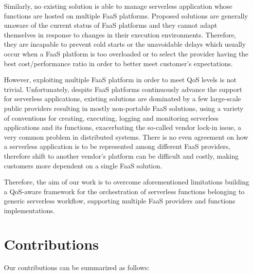 \documentclass[12pt,a4paper]{report}
\begin{document}
Similarly, no existing solution is able to manage serverless application whose functions are hosted on multiple FaaS platforms. Proposed solutions are generally unaware of the current status of FaaS platforms and they cannot adapt themselves in response to changes in their execution environments. Therefore, they are incapable to prevent cold starts or the unavoidable delays which usually occur when a FaaS platform is too overloaded or to select the provider having the best cost/performance ratio in order to better meet customer's expectations.

However, exploiting multiple FaaS platform in order to meet QoS levels is not trivial. Unfortunately, despite FaaS platforms continuously advance the support for serverless applications, existing solutions are dominated by a few large-scale public providers resulting in mostly non-portable FaaS solutions, using a variety of conventions for creating, executing, logging and monitoring serverless applications and its functions, exacerbating the so-called vendor lock-in issue, a very common problem in distributed systems. There is no even agreement on how a serverless application is to be represented among different FaaS providers, therefore shift to another vendor's platform can be difficult and costly, making customers more dependent on a single FaaS solution.

Therefore, the aim of our work is to overcome aforementioned limitations building a QoS-aware framework for the orchestration of serverless functions belonging to generic serverless workflow, supporting multiple FaaS providers and functions implementations.

\section{Contributions}

Our contributions can be summarized as follows:
\end{document}
